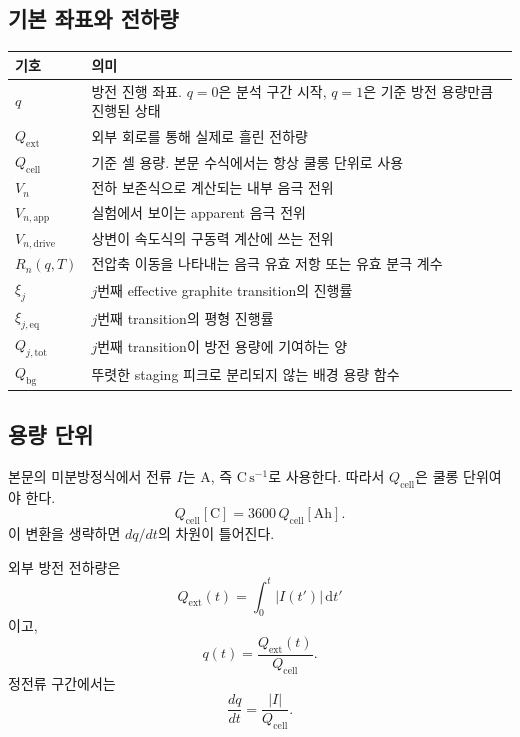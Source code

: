 \documentclass[11pt,a4paper]{article}
\newcommand{\dd}{\mathrm{d}}
\newcommand{\app}{\mathrm{app}}
\newcommand{\drive}{\mathrm{drive}}
\newcommand{\bg}{\mathrm{bg}}
\newcommand{\cell}{\mathrm{cell}}
\newcommand{\ext}{\mathrm{ext}}
\newcommand{\tot}{\mathrm{tot}}
\newcommand{\Ah}{\mathrm{Ah}}
\newcommand{\Cunit}{\mathrm{C}}
\begin{document}
\subsection{기본 좌표와 전하량}
\begin{longtable}{p{} p{}}
\toprule
기호 & 의미 \\
\midrule
\endhead
\(q\) & 방전 진행 좌표. \(q=0\)은 분석 구간 시작, \(q=1\)은 기준 방전 용량만큼 진행된 상태 \\
\(Q_{\ext}\) & 외부 회로를 통해 실제로 흘린 전하량 \\
\(Q_{\cell}\) & 기준 셀 용량. 본문 수식에서는 항상 쿨롱 단위로 사용 \\
\(V_n\) & 전하 보존식으로 계산되는 내부 음극 전위 \\
\(V_{n,\app}\) & 실험에서 보이는 apparent 음극 전위 \\
\(V_{n,\drive}\) & 상변이 속도식의 구동력 계산에 쓰는 전위 \\
\(R_n(q,T)\) & 전압축 이동을 나타내는 음극 유효 저항 또는 유효 분극 계수 \\
\(\xi_j\) & \(j\)번째 effective graphite transition의 진행률 \\
\(\xi_{j,\mathrm{eq}}\) & \(j\)번째 transition의 평형 진행률 \\
\(Q_{j,\tot}\) & \(j\)번째 transition이 방전 용량에 기여하는 양 \\
\(Q_{\bg}\) & 뚜렷한 staging 피크로 분리되지 않는 배경 용량 함수 \\
\bottomrule
\end{longtable}

\subsection{용량 단위}
본문의 미분방정식에서 전류 \(I\)는 A, 즉 \(\mathrm{C\,s^{-1}}\)로 사용한다. 따라서 \(Q_{\cell}\)은 쿨롱 단위여야 한다.
\begin{equation}
Q_{\cell}[\Cunit]=3600\,Q_{\cell}[\Ah].
\end{equation}
이 변환을 생략하면 \(dq/dt\)의 차원이 틀어진다.

외부 방전 전하량은
\begin{equation}
Q_{\ext}(t)=\int_0^t |I(t')|\,\dd t'
\end{equation}
이고,
\begin{equation}
q(t)=\frac{Q_{\ext}(t)}{Q_{\cell}}.
\end{equation}
정전류 구간에서는
\begin{equation}
\frac{dq}{dt}=\frac{|I|}{Q_{\cell}}.
\label{eq:dqdt}
\end{equation}
\end{document}
